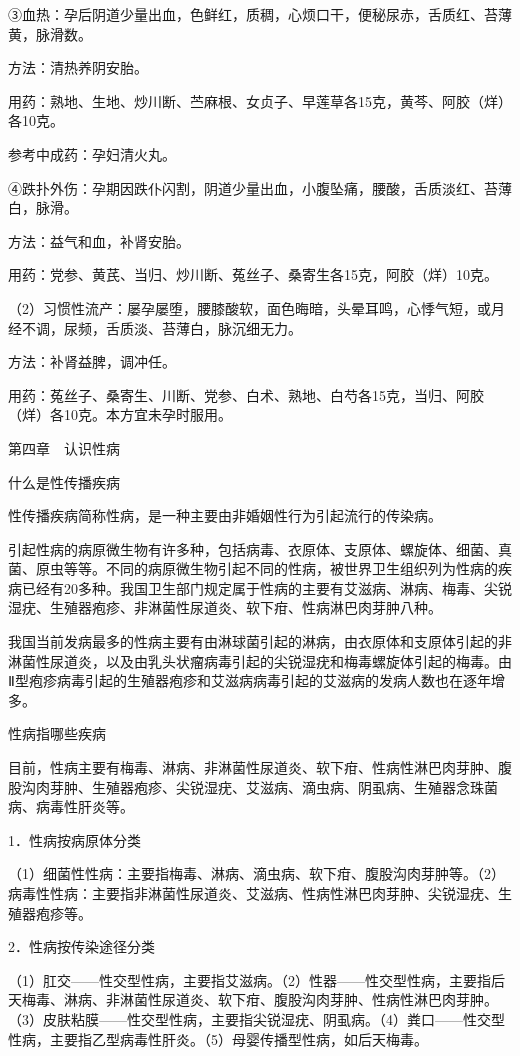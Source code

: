 \documentclass[12pt,UTF8]{ctexbook}
\begin{document}
③血热：孕后阴道少量出血，色鲜红，质稠，心烦口干，便秘尿赤，舌质红、苔薄黄，脉滑数。

方法：清热养阴安胎。

用药：熟地、生地、炒川断、苎麻根、女贞子、早莲草各15克，黄芩、阿胶（烊）各10克。

参考中成药：孕妇清火丸。

④跌扑外伤：孕期因跌仆闪割，阴道少量出血，小腹坠痛，腰酸，舌质淡红、苔薄白，脉滑。

方法：益气和血，补肾安胎。

用药：党参、黄芪、当归、炒川断、菟丝子、桑寄生各15克，阿胶（烊）10克。

（2）习惯性流产：屡孕屡堕，腰膝酸软，面色晦暗，头晕耳鸣，心悸气短，或月经不调，尿频，舌质淡、苔薄白，脉沉细无力。

方法：补肾益脾，调冲任。

用药：菟丝子、桑寄生、川断、党参、白术、熟地、白芍各15克，当归、阿胶（烊）各10克。本方宜未孕时服用。





第四章　认识性病


什么是性传播疾病


性传播疾病简称性病，是一种主要由非婚姻性行为引起流行的传染病。

引起性病的病原微生物有许多种，包括病毒、衣原体、支原体、螺旋体、细菌、真菌、原虫等等。不同的病原微生物引起不同的性病，被世界卫生组织列为性病的疾病已经有20多种。我国卫生部门规定属于性病的主要有艾滋病、淋病、梅毒、尖锐湿疣、生殖器疱疹、非淋菌性尿道炎、软下疳、性病淋巴肉芽肿八种。

我国当前发病最多的性病主要有由淋球菌引起的淋病，由衣原体和支原体引起的非淋菌性尿道炎，以及由乳头状瘤病毒引起的尖锐湿疣和梅毒螺旋体引起的梅毒。由Ⅱ型疱疹病毒引起的生殖器疱疹和艾滋病病毒引起的艾滋病的发病人数也在逐年增多。





性病指哪些疾病


目前，性病主要有梅毒、淋病、非淋菌性尿道炎、软下疳、性病性淋巴肉芽肿、腹股沟肉芽肿、生殖器疱疹、尖锐湿疣、艾滋病、滴虫病、阴虱病、生殖器念珠菌病、病毒性肝炎等。

1．性病按病原体分类

（1）细菌性性病：主要指梅毒、淋病、滴虫病、软下疳、腹股沟肉芽肿等。（2）病毒性性病：主要指非淋菌性尿道炎、艾滋病、性病性淋巴肉芽肿、尖锐湿疣、生殖器疱疹等。

2．性病按传染途径分类

（1）肛交——性交型性病，主要指艾滋病。（2）性器——性交型性病，主要指后天梅毒、淋病、非淋菌性尿道炎、软下疳、腹股沟肉芽肿、性病性淋巴肉芽肿。（3）皮肤粘膜——性交型性病，主要指尖锐湿疣、阴虱病。（4）粪口——性交型性病，主要指乙型病毒性肝炎。（5）母婴传播型性病，如后天梅毒。
\end{document}
